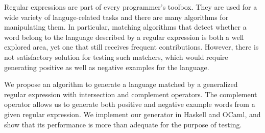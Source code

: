 Regular expressions are part of every programmer's toolbox.  They are
used for a wide variety of languge-related tasks and there are many algorithms for
manipulating them. In particular, matching algorithms that detect
whether a word belong to the language described by a regular
expression is both a well explored area, 
yet one that still receives frequent contributions. However, there is
not satisfactory solution for testing such matchers, which would
require generating positive as well as negative examples for the language. 

We propose an algorithm to generate a language matched by a generalized
regular expression with intersection and complement operators.
The complement operator allows us to generate both positive and
negative example words
from a given regular expression.
We implement our generator in Haskell and OCaml,
and show that its performance is more than
adequate for the purpose of testing.

